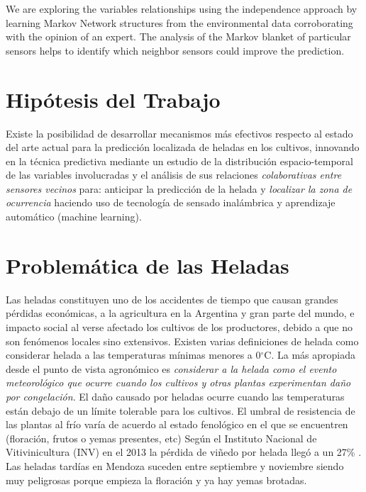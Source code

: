\documentclass[final,a4paper]{llncs}
\newcommand{\degree}{$^{\circ}$}
\begin{document}
We are exploring the variables relationships using the independence approach by 
learning Markov Network structures \cite{koller2009probabilistic} from the environmental 
data corroborating with the opinion of an expert. The analysis of the Markov blanket 
of particular sensors helps to identify which neighbor sensors could improve the 
prediction. 

\section{Hipótesis del Trabajo}

Existe la posibilidad de desarrollar mecanismos más efectivos respecto al estado del 
arte actual para la predicción localizada de heladas en los cultivos, innovando en la
técnica predictiva mediante un estudio de la distribución espacio-temporal de las 
variables involucradas y el análisis de sus relaciones 
\textit{colaborativas entre sensores vecinos} para: anticipar 
la predicción de la helada y \textit{localizar la zona de ocurrencia} haciendo uso de 
tecnología de sensado inalámbrica y aprendizaje automático (machine learning).

\section{Problemática de las Heladas}

Las heladas constituyen uno de los accidentes de tiempo que causan grandes pérdidas 
económicas, a la agricultura en la Argentina y gran parte del mundo, e impacto
social al verse afectado los cultivos de los productores, debido a que no son fenómenos 
locales sino extensivos. Existen varias definiciones de helada como considerar helada a las 
temperaturas mínimas menores a 0\degree C. La más apropiada desde el punto de vista agronómico
es \emph{considerar a la helada como el evento meteorológico que ocurre cuando los cultivos 
y otras plantas experimentan daño por congelación}. El daño causado por heladas ocurre 
cuando las temperaturas están debajo de un límite tolerable para
los cultivos. El umbral de resistencia de las plantas al frío varía de acuerdo 
al estado fenológico en el que se encuentren (floración, frutos o yemas presentes, etc) 
Según el Instituto Nacional de Vitivinicultura (INV) en el 2013 la pérdida de viñedo por
helada llegó a un 27\% \cite{inv-news}. Las heladas tardías en Mendoza suceden entre septiembre y noviembre
siendo muy peligrosas porque empieza la floración y ya hay yemas brotadas. 
\end{document}
